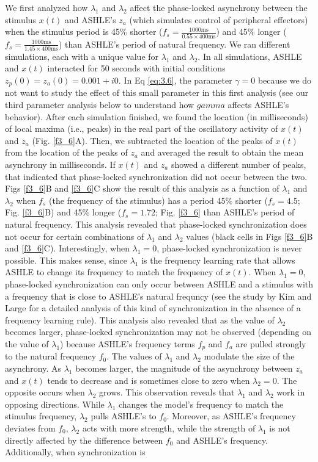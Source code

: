 \documentclass{report}
\begin{document}
We first analyzed how $\lambda_1$ and $\lambda_2$ affect the phase-locked asynchrony between the stimulus $x(t)$ and ASHLE's $z_a$ (which simulates control of peripheral effectors) when the stimulus period is 45\% shorter ($f_s = \frac{1000\text{ms}}{0.55 \times 400\text{ms}}$) and 45\% longer ($f_s = \frac{1000\text{ms}}{1.45 \times 400\text{ms}}$) than ASHLE's period of natural frequency. We ran different simulations, each with a unique value for $\lambda_1$ and $\lambda_2$. In all simulations, ASHLE and $x(t)$ interacted for 50 seconds with initial conditions $z_p(0)=z_a(0)=0.001 + i0$. In Eq \eqref{eq:3.6}, the parameter $\gamma=0$ because we do not want to study the effect of this small parameter in this first analysis (see our third parameter analysis below to understand how $gamma$ affects ASHLE's behavior). After each simulation finished, we found the location (in milliseconds) of local maxima (i.e., peaks) in the real part of the oscillatory activity of $x(t)$ and $z_a$ (Fig.{} \ref{f3_6}A). Then, we subtracted the location of the peaks of $x(t)$ from the location of the peaks of $z_a$ and averaged the result to obtain the mean asynchrony in milliseconds. If $x(t)$ and $z_a$ showed a different number of peaks, that indicated that phase-locked synchronization did not occur between the two. Figs \ref{f3_6}B and \ref{f3_6}C show the result of this analysis as a function of $\lambda_1$ and $\lambda_2$ when $f_s$ (the frequency of the stimulus) has a period 45\% shorter ($f_s = 4.5$; Fig.{} \ref{f3_6}B) and 45\% longer ($f_s = 1.72$; Fig.{} \ref{f3_6} than ASHLE's period of natural frequency. This analysis revealed that phase-locked synchronization does not occur for certain combinations of $\lambda_1$ and $\lambda_2$ values (black cells in Figs \ref{f3_6}B and \ref{f3_6}C). Interestingly, when $\lambda_1=0$, phase-locked synchronization is never possible. This makes sense, since $\lambda_1$ is the frequency learning rate that allows ASHLE to change its frequency to match the frequency of $x(t)$. When $\lambda_1=0$, phase-locked synchronization can only occur between ASHLE and a stimulus with a frequency that is close to ASHLE's natural frequncy (see the study by Kim and Large \cite{kim2015signal} for a detailed analysis of this kind of synchronization in the absence of a frequency learning rule). This analysis also revealed that as the value of $\lambda_2$ becomes larger, phase-locked synchronization may not be observed (depending on the value of $\lambda_1$) because ASHLE's frequency terms $f_p$ and $f_a$ are pulled strongly to the natural frequency $f_0$. The values of $\lambda_1$ and $\lambda_2$ modulate the size of the asynchrony. As $\lambda_1$ becomes larger, the magnitude of the asynchrony between $z_a$ and $x(t)$ tends to decrease and is sometimes close to zero when $\lambda_2=0$. The opposite occurs when $\lambda_2$ grows. This observation reveals that $\lambda_1$ and $\lambda_2$ work in opposing directions. While $\lambda_1$ changes the model's frequency to match the stimulus frequency, $\lambda_2$ pulls ASHLE's to $f_0$. Moreover, as ASHLE's frequency deviates from $f_0$, $\lambda_2$ acts with more strength, while the strength of $\lambda_1$ is not directly affected by the difference between $f_0$ and ASHLE's frequency. Additionally, when synchronization is 
\end{document}
